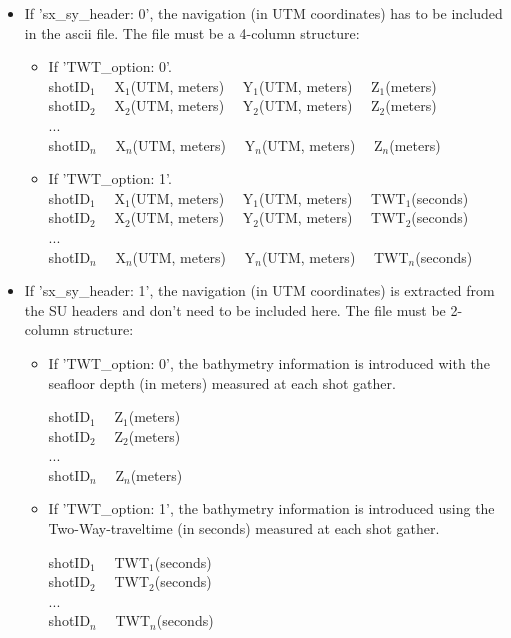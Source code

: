 \documentclass[11pt, oneside]{article}   	%
\begin{document}
\begin{itemize}
\item If 'sx\_sy\_header: 0', the navigation (in UTM coordinates) has to be included in the ascii file. The file must be a 4-column structure:

\begin{itemize}

\item If 'TWT\_option: 0'.  \\ 

shotID$_1$	~~X$_1$(UTM, meters)		~~Y$_1$(UTM, meters)		~~Z$_1$(meters) \\
shotID$_2$	~~X$_2$(UTM, meters)		~~Y$_2$(UTM, meters)		~~Z$_2$(meters) \\
... \\
shotID$_n$	~~X$_n$(UTM, meters)		~~Y$_n$(UTM, meters)		~~Z$_n$(meters) \\

\item If 'TWT\_option: 1'. \\ 

shotID$_1$	~~X$_1$(UTM, meters)		~~Y$_1$(UTM, meters)		~~TWT$_1$(seconds) \\
shotID$_2$	~~X$_2$(UTM, meters)		~~Y$_2$(UTM, meters)		~~TWT$_2$(seconds) \\
... \\
shotID$_n$	~~X$_n$(UTM, meters)		~~Y$_n$(UTM, meters)		~~TWT$_n$(seconds) \\
\end{itemize}

\item If 'sx\_sy\_header: 1', the navigation  (in UTM coordinates) is extracted from the SU headers and don't need to be included here. The file must be 2-column structure: 

\begin{itemize}
\item If 'TWT\_option: 0', the bathymetry information is introduced with the seafloor depth (in meters) measured at each shot gather.

shotID$_1$		~~Z$_1$(meters) \\
shotID$_2$		~~Z$_2$(meters) \\
... \\
shotID$_n$		~~Z$_n$(meters) \\

\item If 'TWT\_option: 1', the bathymetry information is introduced using the Two-Way-traveltime (in seconds) measured at each shot gather. 

shotID$_1$		~~TWT$_1$(seconds) \\
shotID$_2$		~~TWT$_2$(seconds) \\
... \\
shotID$_n$		~~TWT$_n$(seconds) \\

\end{itemize}

\end{itemize}
\end{document}
